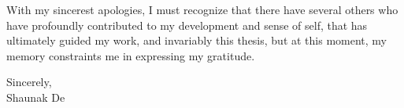 With my sincerest apologies, I must recognize that there have several others who have profoundly contributed to my development and sense of self, that has ultimately guided my work, and invariably this thesis, but at this moment, my memory constraints me in expressing my gratitude. 

\vspace{2em}
\begin{flushleft}
\hspace{4.3in}Sincerely,\\
\hspace{4.3in}Shaunak De
\end{flushleft}